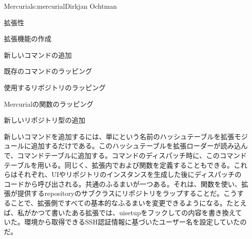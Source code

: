\begin{aosachapter}{Mercurial}{s:mercurial}{Dirkjan Ochtman}
\begin{aosasect1}{拡張性}
\begin{aosasect2}{拡張機能の作成}
\begin{aosaitemize}

  \item 新しいコマンドの追加

  \item 既存のコマンドのラッピング

  \item 使用するリポジトリのラッピング

  \item Mercurialの関数のラッピング

  \item 新しいリポジトリ型の追加

\end{aosaitemize}

新しいコマンドを追加するには、単にという名前のハッシュテーブルを拡張モジュールに追加するだけである。このハッシュテーブルを拡張ローダーが読み込んで、コマンドテーブルに追加する。コマンドのディスパッチ時に、このコマンドテーブルを用いる。同じく、拡張内でおよび関数を定義することもできる。これらはそれぞれ、UIやリポジトリのインスタンスを生成した後にディスパッチのコードから呼び出される。共通のふるまいが一つある。それは、関数を使い、拡張が提供するrepositoryのサブクラスにリポジトリをラップすることだ。こうすることで、拡張側ですべての基本的なふるまいを変更できるようになる。たとえば、私がかつて書いたある拡張では、uisetupをフックしての内容を書き換えていた。環境から取得できるSSH認証情報に基づいたユーザー名を設定していたのだ。


\end{aosasect2}
\end{aosasect1}
\end{aosachapter}
